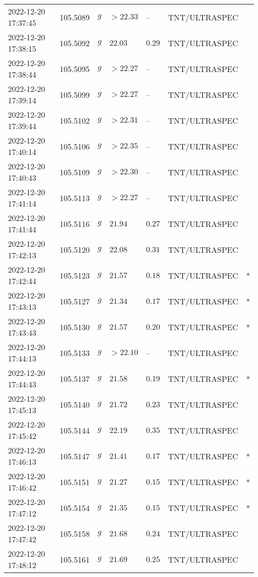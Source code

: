 \documentclass{nature_plusfigure}
\begin{document}
\begin{supplement}
\begin{center}
\begin{longtable}{lllllll}
2022-12-20 17:37:45 & 105.5089 & $g$ & $>22.33$ & -- & TNT/ULTRASPEC &  \\ 
2022-12-20 17:38:15 & 105.5092 & $g$ & $22.03$ & $0.29$ & TNT/ULTRASPEC &  \\ 
2022-12-20 17:38:44 & 105.5095 & $g$ & $>22.27$ & -- & TNT/ULTRASPEC &  \\ 
2022-12-20 17:39:14 & 105.5099 & $g$ & $>22.27$ & -- & TNT/ULTRASPEC &  \\ 
2022-12-20 17:39:44 & 105.5102 & $g$ & $>22.31$ & -- & TNT/ULTRASPEC &  \\ 
2022-12-20 17:40:14 & 105.5106 & $g$ & $>22.35$ & -- & TNT/ULTRASPEC &  \\ 
2022-12-20 17:40:43 & 105.5109 & $g$ & $>22.30$ & -- & TNT/ULTRASPEC &  \\ 
2022-12-20 17:41:14 & 105.5113 & $g$ & $>22.27$ & -- & TNT/ULTRASPEC &  \\ 
2022-12-20 17:41:44 & 105.5116 & $g$ & $21.94$ & $0.27$ & TNT/ULTRASPEC &  \\ 
2022-12-20 17:42:13 & 105.5120 & $g$ & $22.08$ & $0.31$ & TNT/ULTRASPEC &  \\ 
2022-12-20 17:42:44 & 105.5123 & $g$ & $21.57$ & $0.18$ & TNT/ULTRASPEC & * \\ 
2022-12-20 17:43:13 & 105.5127 & $g$ & $21.34$ & $0.17$ & TNT/ULTRASPEC & * \\ 
2022-12-20 17:43:43 & 105.5130 & $g$ & $21.57$ & $0.20$ & TNT/ULTRASPEC & * \\ 
2022-12-20 17:44:13 & 105.5133 & $g$ & $>22.10$ & -- & TNT/ULTRASPEC &  \\ 
2022-12-20 17:44:43 & 105.5137 & $g$ & $21.58$ & $0.19$ & TNT/ULTRASPEC & * \\ 
2022-12-20 17:45:13 & 105.5140 & $g$ & $21.72$ & $0.23$ & TNT/ULTRASPEC &  \\ 
2022-12-20 17:45:42 & 105.5144 & $g$ & $22.19$ & $0.35$ & TNT/ULTRASPEC &  \\ 
2022-12-20 17:46:13 & 105.5147 & $g$ & $21.41$ & $0.17$ & TNT/ULTRASPEC & * \\ 
2022-12-20 17:46:42 & 105.5151 & $g$ & $21.27$ & $0.15$ & TNT/ULTRASPEC & * \\ 
2022-12-20 17:47:12 & 105.5154 & $g$ & $21.35$ & $0.15$ & TNT/ULTRASPEC & * \\ 
2022-12-20 17:47:42 & 105.5158 & $g$ & $21.68$ & $0.24$ & TNT/ULTRASPEC &  \\ 
2022-12-20 17:48:12 & 105.5161 & $g$ & $21.69$ & $0.25$ & TNT/ULTRASPEC &  \\ 

\end{longtable}
\end{center}
\end{supplement}
\end{document}
